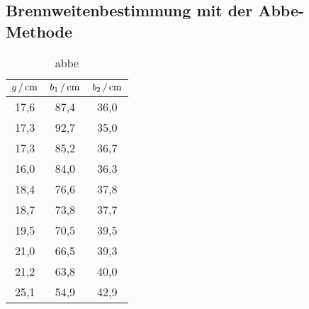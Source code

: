 \subsection{Brennweitenbestimmung mit der Abbe-Methode}
\begin{table}
  \centering
  \caption{abbe}
  \label{tab:abbe}
  \begin{tabular}{ccc}
    \toprule
    $g\,/\,\si{\centi\meter}$ & $b_1\,/\,\si{\centi\meter}$ & $b_2\,/\,\si{\centi\meter}$ \\
    \midrule
    17,6 & 87,4 & 36,0 \\
    17,3 & 92,7 & 35,0 \\
    17,3 & 85,2 & 36,7 \\
    16,0 & 84,0 & 36,3 \\
    18,4 & 76,6 & 37,8 \\
    18,7 & 73,8 & 37,7 \\
    19,5 & 70,5 & 39,5 \\
    21,0 & 66,5 & 39,3 \\
    21,2 & 63,8 & 40,0 \\
    25,1 & 54,9 & 42,9 \\
  \end{tabular}
\end{table}
